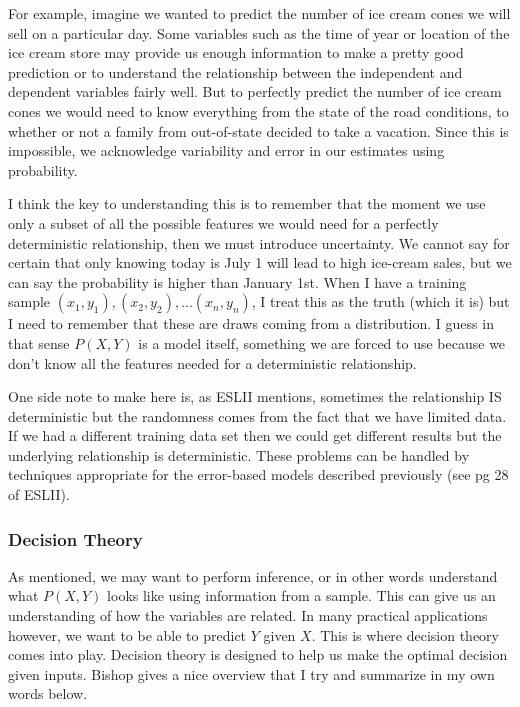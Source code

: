 \documentclass[paper=a4, fontsize=11pt]{scrartcl} %
\numberwithin{equation}{section} %
\numberwithin{figure}{section} %
\numberwithin{table}{section} %
\begin{document}
For example, imagine we wanted to predict the number of ice cream cones we will sell on a particular day. Some variables such as the time of year or location of the ice cream store may provide us enough information to make a pretty good prediction or to understand the relationship between the independent and dependent variables fairly well. But to perfectly predict the number of ice cream cones we would need to know everything from the state of the road conditions, to whether or not a family from out-of-state decided to take a vacation. Since this is impossible, we acknowledge variability and error in our estimates using probability.

I think the key to understanding this is to remember that the moment we use only a subset of all the possible features we would need for a perfectly deterministic relationship, then we must introduce uncertainty. We cannot say for certain that only knowing today is July 1 will lead to high ice-cream sales, but we can say the probability is higher than January 1st. When I have a training sample $(x_1, y_1), (x_2, y_2), ... (x_n, y_n)$,  I treat this as the truth (which it is) but I need to remember that these are draws coming from a distribution. I guess in that sense $P(X,Y)$ is a model itself, something we are forced to use because we don't know all the features needed for a deterministic relationship. 

One side note to make here is, as ESLII mentions, sometimes the relationship IS deterministic but the randomness comes from the fact that we have limited data. If we had a different training data set then we could get different results but the underlying relationship is deterministic. These problems can be handled by techniques appropriate for the error-based models described previously (see pg 28 of ESLII).

\subsubsection{Decision Theory}
As mentioned, we may want to perform inference, or in other words understand what $P(X,Y)$ looks like using information from a sample.  This can give us an understanding of how the variables are related. In many practical applications however, we want to be able to predict $Y$ given $X$. This is where decision theory comes into play. Decision theory is designed to help us make the optimal decision given inputs. Bishop gives a nice overview that I try and summarize in my own words below.
\end{document}
